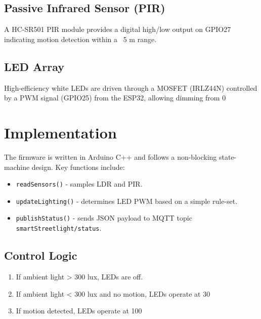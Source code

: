 \documentclass[12pt, a4paper]{article}
\begin{document}
\subsection{Passive Infrared Sensor (PIR)}
A HC-SR501 PIR module provides a digital high/low output on GPIO27 indicating motion detection within a ~5 m range.

\subsection{LED Array}
High-efficiency white LEDs are driven through a MOSFET (IRLZ44N) controlled by a PWM signal (GPIO25) from the ESP32, allowing dimming from 0 %

\section{Implementation}
The firmware is written in Arduino C++ and follows a non-blocking state-machine design. Key functions include:
\begin{itemize}
  \item \texttt{readSensors()} - samples LDR and PIR.
  \item \texttt{updateLighting()} - determines LED PWM based on a simple rule-set.
  \item \texttt{publishStatus()} - sends JSON payload to MQTT topic \texttt{smartStreetlight/status}.
\end{itemize}

\subsection{Control Logic}
\begin{enumerate}
  \item If ambient light > 300 lux, LEDs are off.
  \item If ambient light < 300 lux and no motion, LEDs operate at 30 %
  \item If motion detected, LEDs operate at 100 %
\end{enumerate}
\end{document}
